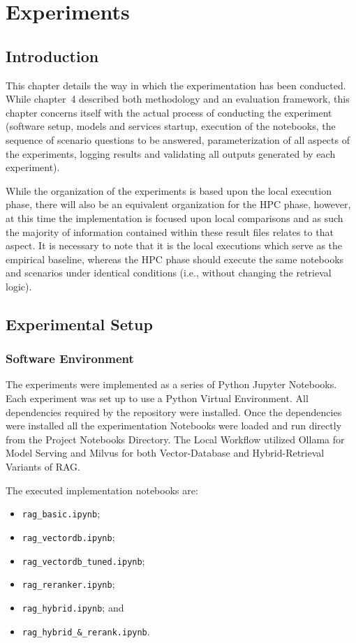 \chapter{Experiments}

\section{Introduction}
This chapter details the way in which the experimentation has been conducted. While chapter~4 described both methodology and an evaluation framework, this chapter concerns itself with the actual process of conducting the experiment (software setup, models and services startup, execution of the notebooks, the sequence of scenario questions to be answered, parameterization of all aspects of the experiments, logging results and validating all outputs generated by each experiment).

While the organization of the experiments is based upon the local execution phase, there will also be an equivalent organization for the HPC phase, however, at this time the implementation is focused upon local comparisons and as such the majority of information contained within these result files relates to that aspect. It is necessary to note that it is the local executions which serve as the empirical baseline, whereas the HPC phase should execute the same notebooks and scenarios under identical conditions (i.e., without changing the retrieval logic).

\section{Experimental Setup}

\subsection{Software Environment}
The experiments were implemented as a series of Python Jupyter Notebooks. Each experiment was set up to use a Python Virtual Environment. All dependencies required by the repository were installed. Once the dependencies were installed all the experimentation Notebooks were loaded and run directly from the Project Notebooks Directory. The Local Workflow utilized Ollama for Model Serving and Milvus for both Vector-Database and Hybrid-Retrieval Variants of RAG.

The executed implementation notebooks are:

\begin{itemize}
    \item \texttt{rag\_\allowbreak basic.ipynb};
    \item \texttt{rag\_\allowbreak vectordb.ipynb};
    \item \texttt{rag\_\allowbreak vectordb\_\allowbreak tuned.ipynb};
    \item \texttt{rag\_\allowbreak reranker.ipynb};
    \item \texttt{rag\_\allowbreak hybrid.ipynb}; and
    \item \texttt{rag\_\allowbreak hybrid\_\&\_\allowbreak rerank.ipynb}.
\end{itemize}

